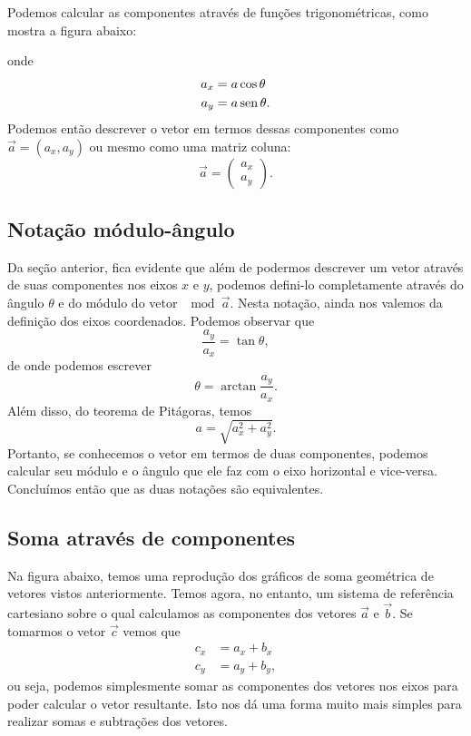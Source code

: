 Podemos calcular as componentes através de funções trigonométricas, como mostra a figura abaixo:


\noindent{}onde
\begin{align}
  a_x &= a \cos\theta \\
  a_y &= a \operatorname{sen}\theta.
\end{align}
%
Podemos então descrever o vetor em termos dessas componentes como $\vec{a} = (a_x, a_y)$ ou mesmo como uma matriz coluna:
\begin{equation}
  \vec{a} = \begin{pmatrix} a_x \\ a_y \end{pmatrix}.
\end{equation}

\subsection{Notação módulo-ângulo}

Da seção anterior, fica evidente que além de podermos descrever um vetor através de suas componentes nos eixos $x$ e $y$, podemos defini-lo completamente através do ângulo $\theta$ e do módulo do vetor $\mod{\vec{a}}$. Nesta notação, ainda nos valemos da definição dos eixos coordenados. Podemos observar que
\begin{equation}
  \frac{a_y}{a_x} = \tan\theta,
\end{equation}
%
de onde podemos escrever
\begin{equation}
  \theta = \arctan\frac{a_y}{a_x}.
\end{equation}
%
Além disso, do teorema de Pitágoras, temos
\begin{equation}
  a = \sqrt{a_ x^2 + a_y^2}.
\end{equation}
%
Portanto, se conhecemos o vetor em termos de duas componentes, podemos calcular seu módulo e o ângulo que ele faz com o eixo horizontal e vice-versa. Concluímos então que as duas notações são equivalentes.

\subsection{Soma através de componentes}

Na figura abaixo, temos uma reprodução dos gráficos de soma geométrica de vetores vistos anteriormente. Temos agora, no entanto, um sistema de referência cartesiano sobre o qual calculamos as componentes dos vetores $\vec{a}$ e $\vec{b}$. Se tomarmos o vetor $\vec{c}$ vemos que
\begin{align}
  c_x &= a_x + b_x \\
  c_y &= a_y + b_y,
\end{align}
%
ou seja, podemos simplesmente somar as componentes dos vetores nos eixos para poder calcular o vetor resultante. Isto nos dá uma forma muito mais simples para realizar somas e subtrações dos vetores.

